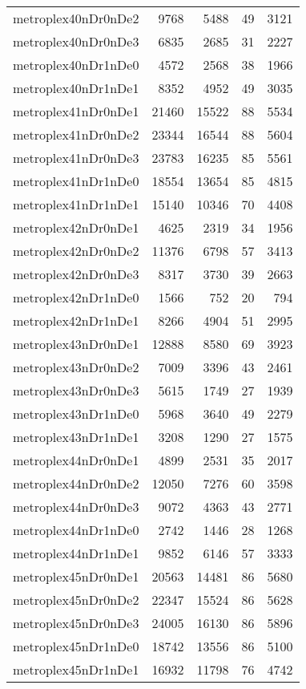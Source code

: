 \begin{longtable}{lrrrr}
metroplex40nDr0nDe2 & 9768 & 5488 & 49 & 3121 \\
metroplex40nDr0nDe3 & 6835 & 2685 & 31 & 2227 \\
metroplex40nDr1nDe0 & 4572 & 2568 & 38 & 1966 \\
metroplex40nDr1nDe1 & 8352 & 4952 & 49 & 3035 \\
metroplex41nDr0nDe1 & 21460 & 15522 & 88 & 5534 \\
metroplex41nDr0nDe2 & 23344 & 16544 & 88 & 5604 \\
metroplex41nDr0nDe3 & 23783 & 16235 & 85 & 5561 \\
metroplex41nDr1nDe0 & 18554 & 13654 & 85 & 4815 \\
metroplex41nDr1nDe1 & 15140 & 10346 & 70 & 4408 \\
metroplex42nDr0nDe1 & 4625 & 2319 & 34 & 1956 \\
metroplex42nDr0nDe2 & 11376 & 6798 & 57 & 3413 \\
metroplex42nDr0nDe3 & 8317 & 3730 & 39 & 2663 \\
metroplex42nDr1nDe0 & 1566 & 752 & 20 & 794 \\
metroplex42nDr1nDe1 & 8266 & 4904 & 51 & 2995 \\
metroplex43nDr0nDe1 & 12888 & 8580 & 69 & 3923 \\
metroplex43nDr0nDe2 & 7009 & 3396 & 43 & 2461 \\
metroplex43nDr0nDe3 & 5615 & 1749 & 27 & 1939 \\
metroplex43nDr1nDe0 & 5968 & 3640 & 49 & 2279 \\
metroplex43nDr1nDe1 & 3208 & 1290 & 27 & 1575 \\
metroplex44nDr0nDe1 & 4899 & 2531 & 35 & 2017 \\
metroplex44nDr0nDe2 & 12050 & 7276 & 60 & 3598 \\
metroplex44nDr0nDe3 & 9072 & 4363 & 43 & 2771 \\
metroplex44nDr1nDe0 & 2742 & 1446 & 28 & 1268 \\
metroplex44nDr1nDe1 & 9852 & 6146 & 57 & 3333 \\
metroplex45nDr0nDe1 & 20563 & 14481 & 86 & 5680 \\
metroplex45nDr0nDe2 & 22347 & 15524 & 86 & 5628 \\
metroplex45nDr0nDe3 & 24005 & 16130 & 86 & 5896 \\
metroplex45nDr1nDe0 & 18742 & 13556 & 86 & 5100 \\
metroplex45nDr1nDe1 & 16932 & 11798 & 76 & 4742 \\

\end{longtable}
